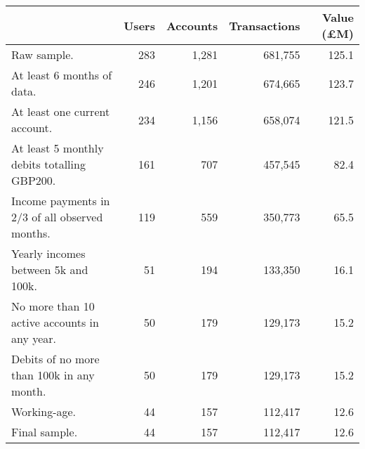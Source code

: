 \begin{tabular}{lrrrr}
\toprule
                                               & Users & Accounts & Transactions & Value (\pounds M) \\
\midrule
                                   Raw sample. &   283 &    1,281 &      681,755 &             125.1 \\
                    At least 6 months of data. &   246 &    1,201 &      674,665 &             123.7 \\
                 At least one current account. &   234 &    1,156 &      658,074 &             121.5 \\
   At least 5 monthly debits totalling GBP200. &   161 &      707 &      457,545 &              82.4 \\
Income payments in 2/3 of all observed months. &   119 &      559 &      350,773 &              65.5 \\
           Yearly incomes between 5k and 100k. &    51 &      194 &      133,350 &              16.1 \\
  No more than 10 active accounts in any year. &    50 &      179 &      129,173 &              15.2 \\
     Debits of no more than 100k in any month. &    50 &      179 &      129,173 &              15.2 \\
                                  Working-age. &    44 &      157 &      112,417 &              12.6 \\
                                 Final sample. &    44 &      157 &      112,417 &              12.6 \\
\bottomrule
\end{tabular}
